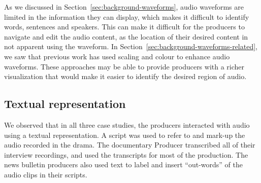 As we discussed in Section~\ref{sec:background-waveforms}, audio waveforms are limited in the information they can
display, which makes it difficult to identify words, sentences and speakers.  This can make it difficult for the
producers to navigate and edit the audio content, as the location of their desired content in not apparent using the
waveform. In Section~\ref{sec:background-waveforms-related}, we saw that previous work has used scaling and colour to
enhance audio waveforms. These approaches may be able to provide producers with a richer visualization that would make
it easier to identify the desired region of audio.



\subsection{Textual representation}
We observed that in all three case studies, the producers interacted with audio using a textual representation. A
script was used to refer to and mark-up the audio recorded in the drama. The documentary Producer transcribed all of
their interview recordings, and used the transcripts for most of the production. The news bulletin producers also used
text to label and insert ``out-words'' of the audio clips in their scripts.

